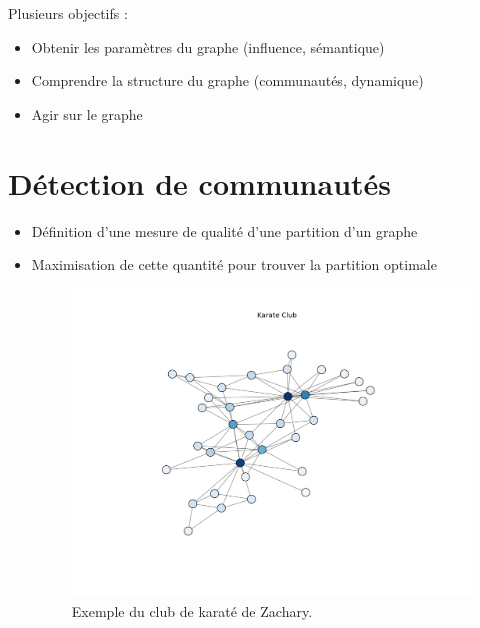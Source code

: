 \documentclass[c]{beamer}
\begin{document}
\begin{frame}
\begin{columns}
\begin{column}{.5\textwidth}
{\begin{figure}
                \end{figure}
            }
        \end{column}
    \end{columns}
\end{frame}

\begin{frame}
    Plusieurs objectifs :
    \begin{itemize}
        \item Obtenir les paramètres du graphe (influence, sémantique)
        \item Comprendre la structure du graphe (communautés, dynamique)
        \item Agir sur le graphe
    \end{itemize}
\end{frame}

\section{Détection de communautés}
\begin{frame}

    \begin{itemize}
        \item Définition d'une mesure de qualité d'une partition d'un
        graphe
        \item Maximisation de cette quantité pour trouver la partition
        optimale

        \begin{figure}
            \includegraphics[width=.6\textwidth]{./figures/karate_club.png}
            \caption{Exemple du club de karaté de Zachary.}
        \end{figure}
    \end{itemize}
\end{frame}
\end{document}
